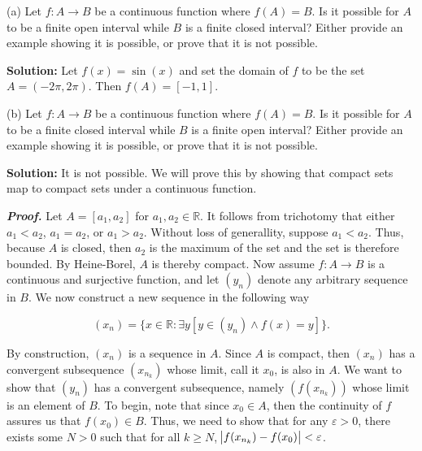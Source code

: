 \documentclass[12pt, a4paper]{article}
\begin{document}
\begin{description}
    \item(a) Let $f\colon A\rightarrow B$ be a continuous function where $f(A)=B$. Is it possible for $A$ to be a finite open interval while $B$ is a finite closed interval? Either provide an example showing it is possible, or prove that it is not possible.
    
    \begin{description}
        \item\textbf{Solution: }Let $f(x)=\sin{(x)}$ and set the domain of $f$ to be the set $A=(-2\pi,2\pi)$. Then $f(A)=[-1,1]$.
    \end{description}
    
    \item(b) Let $f\colon A\rightarrow B$ be a continuous function where $f(A)=B$. Is it possible for $A$ to be a finite closed interval while $B$ is a finite open interval? Either provide an example showing it is possible, or prove that it is not possible.
    
    \begin{description}
        \item\textbf{Solution: } It is not possible. We will prove this by showing that compact sets map to compact sets under a continuous function.
    \end{description}
    
    
    
    \begin{description}
        \item\textit{\textbf{Proof. }} Let $A=[a_1,a_2]$ for $a_1,a_2\in\mathbb{R}$. It follows from trichotomy that either $a_1<a_2$, $a_1=a_2$, or $a_1>a_2$. Without loss of generallity, suppose $a_1<a_2$. Thus, because $A$ is closed, then $a_2$ is the maximum of the set and the set is therefore bounded. By Heine-Borel, $A$ is thereby compact. Now assume $f\colon A\rightarrow B$ is a continuous and surjective function, and let $(y_n)$ denote any arbitrary sequence in $B$. We now construct a new sequence in the following way
        
        \begin{equation*}
            (x_n) = \{x\in\mathbb{R}\colon \exists y[ y\in(y_n)\wedge f(x)=y]\}.
        \end{equation*}
        
        \vspace{2mm}
        
        \item By construction, $(x_n)$ is a sequence in $A$. Since $A$ is compact, then $(x_n)$ has a convergent subsequence $(x_{n_k})$ whose limit, call it $x_0$, is also in $A$. We want to show that $(y_n)$ has a convergent subsequence, namely $(f(x_{n_k}))$ whose limit is an element of $B$. To begin, note that since $x_0\in A$, then the continuity of $f$ assures us that $f(x_0)\in B$. Thus, we need to show that for any $\varepsilon>0$, there exists some $N>0$ such that for all $k\geq N$, $\abs{f(x_{n_k})-f(x_0)}<\varepsilon$. 
        

\end{description}
\end{description}
\end{document}
